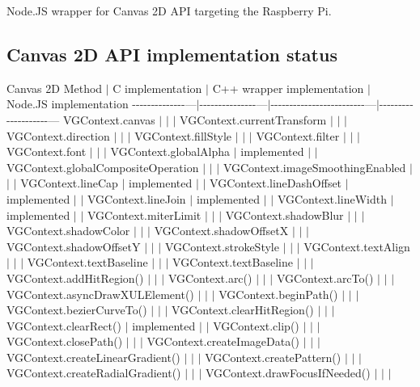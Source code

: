 Node.\+J\+S wrapper for Canvas 2\+D A\+P\+I targeting the Raspberry Pi.

\subsection*{Canvas 2\+D A\+P\+I implementation status}

Canvas 2\+D Method $\vert$ C implementation $\vert$ C++ wrapper implementation $\vert$ Node.\+J\+S implementation -\/-\/-\/-\/-\/-\/-\/-\/-\/-\/-\/-\/-\/-\/---$\vert$-\/-\/-\/-\/-\/-\/-\/-\/-\/-\/-\/-\/-\/-\/-\/---$\vert$-\/-\/-\/-\/-\/-\/-\/-\/-\/-\/-\/-\/-\/-\/-\/-\/-\/-\/-\/-\/-\/-\/-\/-\/-\/---$\vert$-\/-\/-\/-\/-\/-\/-\/-\/-\/-\/-\/-\/-\/-\/-\/-\/-\/-\/-\/-\/--- {\ttfamily V\+G\+Context.\+canvas} $\vert$ $\vert$ $\vert$ {\ttfamily V\+G\+Context.\+current\+Transform} $\vert$ $\vert$ $\vert$ {\ttfamily V\+G\+Context.\+direction} $\vert$ $\vert$ $\vert$ {\ttfamily V\+G\+Context.\+fill\+Style} $\vert$ $\vert$ $\vert$ {\ttfamily V\+G\+Context.\+filter} $\vert$ $\vert$ $\vert$ {\ttfamily V\+G\+Context.\+font} $\vert$ $\vert$ $\vert$ {\ttfamily V\+G\+Context.\+global\+Alpha} $\vert$ implemented $\vert$ $\vert$ {\ttfamily V\+G\+Context.\+global\+Composite\+Operation} $\vert$ $\vert$ $\vert$ {\ttfamily V\+G\+Context.\+image\+Smoothing\+Enabled} $\vert$ $\vert$ $\vert$ {\ttfamily V\+G\+Context.\+line\+Cap} $\vert$ implemented $\vert$ $\vert$ {\ttfamily V\+G\+Context.\+line\+Dash\+Offset} $\vert$ implemented $\vert$ $\vert$ {\ttfamily V\+G\+Context.\+line\+Join} $\vert$ implemented $\vert$ $\vert$ {\ttfamily V\+G\+Context.\+line\+Width} $\vert$ implemented $\vert$ $\vert$ {\ttfamily V\+G\+Context.\+miter\+Limit} $\vert$ $\vert$ $\vert$ {\ttfamily V\+G\+Context.\+shadow\+Blur} $\vert$ $\vert$ $\vert$ {\ttfamily V\+G\+Context.\+shadow\+Color} $\vert$ $\vert$ $\vert$ {\ttfamily V\+G\+Context.\+shadow\+Offset\+X} $\vert$ $\vert$ $\vert$ {\ttfamily V\+G\+Context.\+shadow\+Offset\+Y} $\vert$ $\vert$ $\vert$ {\ttfamily V\+G\+Context.\+stroke\+Style} $\vert$ $\vert$ $\vert$ {\ttfamily V\+G\+Context.\+text\+Align} $\vert$ $\vert$ $\vert$ {\ttfamily V\+G\+Context.\+text\+Baseline} $\vert$ $\vert$ $\vert$ {\ttfamily V\+G\+Context.\+text\+Baseline} $\vert$ $\vert$ $\vert$ {\ttfamily V\+G\+Context.\+add\+Hit\+Region()} $\vert$ $\vert$ $\vert$ {\ttfamily V\+G\+Context.\+arc()} $\vert$ $\vert$ $\vert$ {\ttfamily V\+G\+Context.\+arc\+To()} $\vert$ $\vert$ $\vert$ {\ttfamily V\+G\+Context.\+async\+Draw\+X\+U\+L\+Element()} $\vert$ $\vert$ $\vert$ {\ttfamily V\+G\+Context.\+begin\+Path()} $\vert$ $\vert$ $\vert$ {\ttfamily V\+G\+Context.\+bezier\+Curve\+To()} $\vert$ $\vert$ $\vert$ {\ttfamily V\+G\+Context.\+clear\+Hit\+Region()} $\vert$ $\vert$ $\vert$ {\ttfamily V\+G\+Context.\+clear\+Rect()} $\vert$ implemented $\vert$ $\vert$ {\ttfamily V\+G\+Context.\+clip()} $\vert$ $\vert$ $\vert$ {\ttfamily V\+G\+Context.\+close\+Path()} $\vert$ $\vert$ $\vert$ {\ttfamily V\+G\+Context.\+create\+Image\+Data()} $\vert$ $\vert$ $\vert$ {\ttfamily V\+G\+Context.\+create\+Linear\+Gradient()} $\vert$ $\vert$ $\vert$ {\ttfamily V\+G\+Context.\+create\+Pattern()} $\vert$ $\vert$ $\vert$ {\ttfamily V\+G\+Context.\+create\+Radial\+Gradient()} $\vert$ $\vert$ $\vert$ {\ttfamily V\+G\+Context.\+draw\+Focus\+If\+Needed()} $\vert$ $\vert$ $\vert$ 